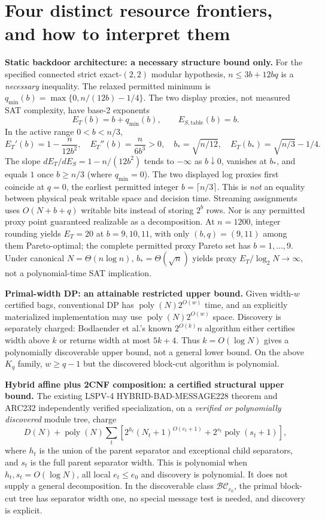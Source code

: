 \documentclass[10pt]{article}
\begin{document}
\section{Four distinct resource frontiers, and how to interpret them}
\noindent\textbf{Static backdoor architecture: a necessary structure bound only.} For the specified connected strict exact-$(2,2)$ modular hypothesis, $n\le3b+12bq$ is a \emph{necessary} inequality. The relaxed permitted minimum is $q_{\min}(b)=\max\{0,n/(12b)-1/4\}$. The two display proxies, not measured SAT complexity, have base-2 exponents
\[
 E_T(b)=b+q_{\min}(b),\qquad E_{S,\mathrm{table}}(b)=b.
\]
In the active range $0<b<n/3$,
\[
 E_T'(b)=1-\frac{n}{12b^2},\quad E_T''(b)=\frac{n}{6b^3}>0,\quad
 b_* =\sqrt{n/12},\quad E_T(b_*)=\sqrt{n/3}-1/4.
\]
The slope $dE_T/dE_S=1-n/(12b^2)$ tends to $-\infty$ as $b\downarrow0$, vanishes at $b_*$, and equals $1$ once $b\ge n/3$ (where $q_{\min}=0$). The two displayed log proxies first coincide at $q=0$, the earliest permitted integer $b=\lceil n/3\rceil$. This is \emph{not} an equality between physical peak writable space and decision time. Streaming assignments uses $O(N+b+q)$ writable bits instead of storing $2^b$ rows. Nor is any permitted proxy point guaranteed realizable as a decomposition. At $n=1200$, integer rounding yields $E_T=20$ at $b=9,10,11$, with only $(b,q)=(9,11)$ among them Pareto-optimal; the complete permitted proxy Pareto set has $b=1,\ldots,9$. Under canonical $N=\Theta(n\log n)$, $b_*=\Theta(\sqrt n)$ yields proxy $E_T/\log_2 N\to\infty$, not a polynomial-time SAT implication.

\noindent\textbf{Primal-width DP: an attainable restricted upper bound.} Given width-$w$ certified bags, conventional DP has $\operatorname{poly}(N)2^{O(w)}$ time, and an explicitly materialized implementation may use $\operatorname{poly}(N)2^{O(w)}$ space. Discovery is separately charged: Bodlaender et al.'s known $2^{O(k)}n$ algorithm either certifies width above $k$ or returns width at most $5k+4$. Thus $k=O(\log N)$ gives a polynomially discoverable upper bound, not a general lower bound. On the above $K_q$ family, $w\ge q-1$ but the discovered block-cut algorithm is polynomial.

\noindent\textbf{Hybrid affine plus 2CNF composition: a certified structural upper bound.} The existing LSPV-4 HYBRID-BAD-MESSAGE228 theorem and ARC232 independently verified specialization, on a \emph{verified or polynomially discovered} module tree, charge
\[
 D(N)+\operatorname{poly}(N)\sum_t\left[2^{h_t}(N_t+1)^{O(e_t+1)}
 +2^{s_t}\operatorname{poly}(s_t+1)\right],
\]
where $h_t$ is the union of the parent separator and exceptional child separators, and $s_t$ is the full parent separator width. This is polynomial when $h_t,s_t=O(\log N)$, all local $e_t\le e_0$ and discovery is polynomial. It does not supply a general decomposition. In the discoverable class $\mathcal{BC}_{e_0}$, the primal block-cut tree has separator width one, no special message test is needed, and discovery is explicit.
\end{document}
